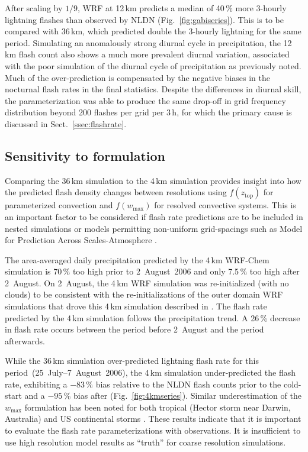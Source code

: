 After scaling by $1/9$, WRF at 12\,\unit{km} predicts a median of 40\,{\%}
more 3-hourly lightning flashes than observed by NLDN
(Fig.~\ref{fig:gabiseries}). This is to be compared with 36\,\unit{km}, which
predicted double the 3-hourly lightning for the same period. Simulating an
anomalously strong diurnal cycle in precipitation, the 12\,\unit{km} flash
count also shows a much more prevalent diurnal variation, associated with the
poor simulation of the diurnal cycle of precipitation as previously noted.
Much of the over-prediction is compensated by the negative biases in the
nocturnal flash rates in the final statistics. Despite the differences in
diurnal skill, the parameterization was able to produce the same drop-off in
grid frequency distribution beyond 200 flashes per grid per 3\,h, for which
the primary cause is discussed in Sect.~\ref{ssec:flashrate}.

\subsection{Sensitivity to formulation}\label{ssec:formsens}

Comparing the 36\,\unit{km} simulation to the 4\,\unit{km} simulation
provides insight into how the predicted flash density changes between
resolutions using $f(z_{\mathrm{top}})$ for parameterized convection and
$f(w_{\max})$ for resolved convective systems. This is an important factor to
be considered if flash rate predictions are to be included in nested
simulations or models permitting non-uniform grid-spacings such as Model for
Prediction Across Scales-Atmosphere \citep[MPAS-A;][]{Skamarock:2012fk}.

The area-averaged daily precipitation predicted by the 4\,\unit{km} WRF-Chem
simulation is 70\,{\%} too high prior to 2~August~2006 and only 7.5\,{\%} too high
after 2~August. On 2~August, the 4\,\unit{km} WRF simulation was
re-initialized (with no clouds) to be consistent with the re-initializations
of the outer domain WRF simulations that drove this 4\,\unit{km} simulation
described in \cite{Barth:2012qf}. The flash rate predicted by the
4\,\unit{km} simulation follows the precipitation trend. A 26\,{\%} decrease
in flash rate occurs between the period before 2~August and the period
afterwards.

While the 36\,\unit{km} simulation over-predicted lightning flash rate for
this period~(25~July--7~August~2006), the 4\,\unit{km} simulation
under-predicted the flash rate, exhibiting a $-83\,{\%}$ bias relative to the
NLDN flash counts prior to the cold-start and a $-95\,{\%}$ bias after
(Fig.~\ref{fig:4kmseries}). Similar underestimation of the $w_{\max}$
formulation has been noted for both tropical (Hector storm near Darwin,
Australia) and US continental storms \citep{Cummings:2012ly}. These results
indicate that it is important to evaluate the flash rate parameterizations
with observations. It is insufficient to use high resolution model results as
``truth'' for coarse resolution simulations.

